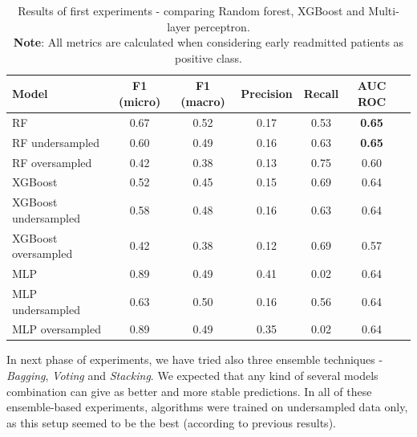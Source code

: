 \documentclass[runningheads]{llncs}
\begin{document}
\begin{table}
    \centering
    \caption{Results of first experiments - comparing Random forest, XGBoost and Multi-layer perceptron.\\\textbf{Note}: All metrics are calculated when considering early readmitted patients as positive class.}
    \begin{tabular}{ |l|c|c|c|c|c|c| } 
    \hline
    \textbf{Model} & \textbf{F1 (micro)} & \textbf{F1 (macro)} & \textbf{Precision} &  \textbf{Recall} &  \textbf{AUC ROC} \\
    \hline
    RF &   0.67    &   0.52    &   0.17    &   0.53   &   \textbf{0.65}\\
    RF undersampled &   0.60    &   0.49    &   0.16    &   0.63   &   \textbf{0.65}   \\
    RF oversampled &   0.42    &   0.38    &   0.13    &   0.75   &   0.60   \\
    \hline
    XGBoost &   0.52    &   0.45    &   0.15    &   0.69   &   0.64   \\
    XGBoost undersampled &   0.58    &   0.48    &   0.16    &   0.63   &   0.64   \\
    XGBoost oversampled &   0.42    &   0.38    &   0.12    &   0.69   &   0.57   \\
    \hline
    MLP &   0.89    &   0.49    &   0.41    &   0.02   &   0.64   \\
    MLP undersampled &   0.63    &   0.50    &   0.16    &   0.56   &   0.64   \\
    MLP oversampled &   0.89    &   0.49    &   0.35    &   0.02   &   0.64   \\
    \hline
    \end{tabular}
    \label{table:preliminary-results}
\end{table}

In next phase of experiments, we have tried also three ensemble techniques - \textit{Bagging}, \textit{Voting} and \textit{Stacking}. We expected that any kind of several models combination can give as better and more stable predictions. In all of these ensemble-based experiments, algorithms were trained on undersampled data only, as this setup seemed to be the best (according to previous results).
\end{document}

